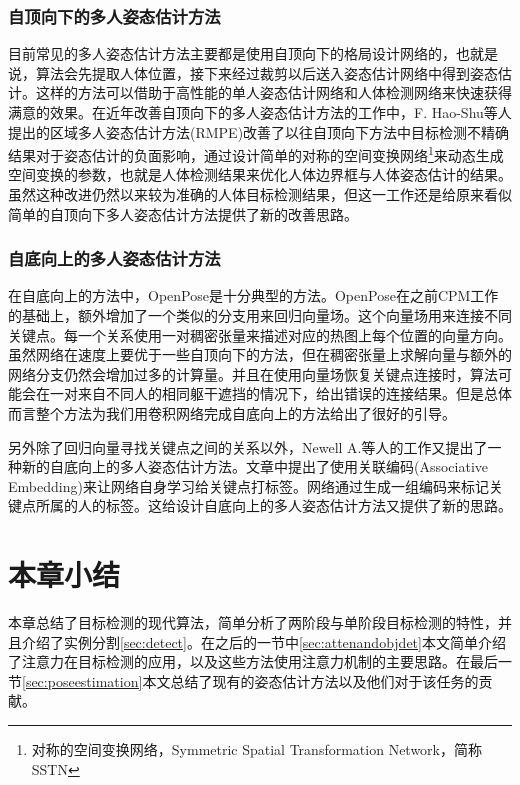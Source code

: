 \subsubsection{自顶向下的多人姿态估计方法}
\label{subsubsec:topdownpose}
目前常见的多人姿态估计方法主要都是使用自顶向下的格局设计网络的，也就是说，算法会先提取人体位置，接下来经过裁剪以后送入姿态估计网络中得到姿态估计。这样的方法可以借助于高性能的单人姿态估计网络和人体检测网络来快速获得满意的效果。在近年改善自顶向下的多人姿态估计方法的工作中，F. Hao-Shu\cite{fang2017rmpe}等人提出的区域多人姿态估计方法(RMPE)改善了以往自顶向下方法中目标检测不精确结果对于姿态估计的负面影响，通过设计简单的对称的空间变换网络\footnote{对称的空间变换网络，Symmetric Spatial Transformation Network，简称SSTN}来动态生成空间变换的参数，也就是人体检测结果来优化人体边界框与人体姿态估计的结果。虽然这种改进仍然以来较为准确的人体目标检测结果，但这一工作还是给原来看似简单的自顶向下多人姿态估计方法提供了新的改善思路。

\subsubsection{自底向上的多人姿态估计方法}
\label{subsubsec:bottomuppose}
在自底向上的方法中，OpenPose\cite{Cao2016Realtime}是十分典型的方法。OpenPose在之前CPM工作的基础上，额外增加了一个类似的分支用来回归向量场。这个向量场用来连接不同关键点。每一个关系使用一对稠密张量来描述对应的热图上每个位置的向量方向。虽然网络在速度上要优于一些自顶向下的方法，但在稠密张量上求解向量与额外的网络分支仍然会增加过多的计算量。并且在使用向量场恢复关键点连接时，算法可能会在一对来自不同人的相同躯干遮挡的情况下，给出错误的连接结果。但是总体而言整个方法为我们用卷积网络完成自底向上的方法给出了很好的引导。

另外除了回归向量寻找关键点之间的关系以外，Newell A.\cite{Newell2017Associative}等人的工作又提出了一种新的自底向上的多人姿态估计方法。文章中提出了使用关联编码(Associative Embedding)来让网络自身学习给关键点打标签。网络通过生成一组编码来标记关键点所属的人的标签。这给设计自底向上的多人姿态估计方法又提供了新的思路。


\section{本章小结}
本章总结了目标检测的现代算法，简单分析了两阶段与单阶段目标检测的特性，并且介绍了实例分割\ref{sec:detect}。在之后的一节中\ref{sec:attenandobjdet}本文简单介绍了注意力在目标检测的应用，以及这些方法使用注意力机制的主要思路。在最后一节\ref{sec:poseestimation}本文总结了现有的姿态估计方法以及他们对于该任务的贡献。

